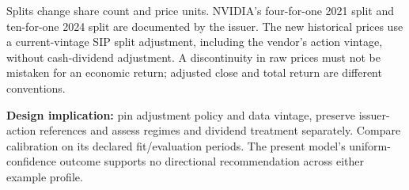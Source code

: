 Splits change share count and price units. NVIDIA's four-for-one 2021 split and ten-for-one 2024 split are documented by the issuer\cite{nvda_split_2021,nvda_split_2024}. The new historical prices use a current-vintage SIP split adjustment, including the vendor's action vintage, without cash-dividend adjustment. A discontinuity in raw prices must not be mistaken for an economic return; adjusted close and total return are different conventions.

\textbf{Design implication:} pin adjustment policy and data vintage, preserve issuer-action references and assess regimes and dividend treatment separately. Compare calibration on its declared fit/evaluation periods. The present model's uniform-confidence outcome supports no directional recommendation across either example profile.
